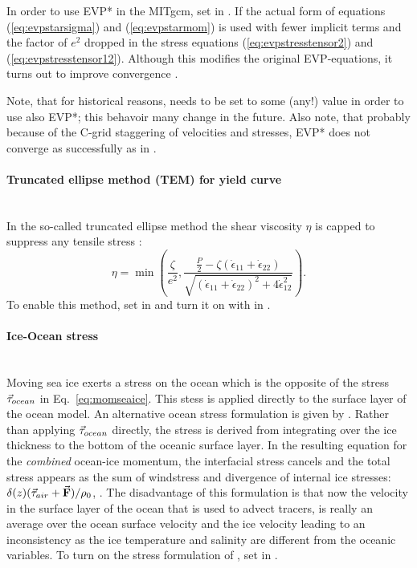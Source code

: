 In order to use EVP* in the MITgcm, set  in . If 
the actual form of equations (\ref{eq:evpstarsigma}) and
(\ref{eq:evpstarmom}) is used with fewer implicit terms and the factor
of $e^{2}$ dropped in the stress equations (\ref{eq:evpstresstensor2})
and (\ref{eq:evpstresstensor12}). Although this modifies the original
EVP-equations, it turns out to improve convergence \citep{bouillon13}.

Note, that for historical reasons,  needs to
be set to some (any!) value in order to use also EVP*; this behavoir
many change in the future. Also note, that
probably because of the C-grid staggering of velocities and stresses,
EVP* does not converge as successfully as in \citet{kimmritz15}.

\paragraph{Truncated ellipse method (TEM) for yield curve \label{sec:pkg:seaice:TEM}}~\\
%
In the so-called truncated ellipse method the shear viscosity $\eta$
is capped to suppress any tensile stress \citep{hibler97, geiger98}:
\begin{equation}
  \label{eq:etatem}
  \eta = \min\left(\frac{\zeta}{e^2},
  \frac{\frac{P}{2}-\zeta(\dot{\epsilon}_{11}+\dot{\epsilon}_{22})}
  {\sqrt{(\dot{\epsilon}_{11}+\dot{\epsilon}_{22})^2
      +4\dot{\epsilon}_{12}^2}}\right).
\end{equation}
To enable this method, set  in
 and turn it on with
 in . 

\paragraph{Ice-Ocean stress \label{sec:pkg:seaice:iceoceanstress}}~\\
%
Moving sea ice exerts a stress on the ocean which is the opposite of
the stress $\vec{\mathbf{\mathbf{\tau}}}_{ocean}$ in Eq.~\ref{eq:momseaice}. This stess is
applied directly to the surface layer of the ocean model. An
alternative ocean stress formulation is given by \citet{hibler87}.
Rather than applying $\vec{\mathbf{\mathbf{\tau}}}_{ocean}$ directly, the stress is derived
from integrating over the ice thickness to the bottom of the oceanic
surface layer. In the resulting equation for the \emph{combined}
ocean-ice momentum, the interfacial stress cancels and the total
stress appears as the sum of windstress and divergence of internal ice
stresses: $\delta(z) (\vec{\mathbf{\mathbf{\tau}}}_{air} + \vec{\mathbf{F}})/\rho_0$, \citep[see also
Eq.\,2 of][]{hibler87}. The disadvantage of this formulation is that
now the velocity in the surface layer of the ocean that is used to
advect tracers, is really an average over the ocean surface
velocity and the ice velocity leading to an inconsistency as the ice
temperature and salinity are different from the oceanic variables.
To turn on the stress formulation of \citet{hibler87}, set
 in .


